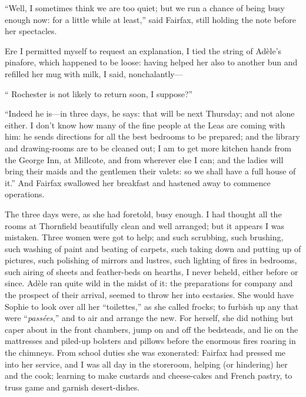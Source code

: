 \enquote{Well, I sometimes think we are too quiet; but we run a chance
of being busy enough now: for a little while at least,} said \Mrs{}
Fairfax, still holding the note before her spectacles.

Ere I permitted myself to request an explanation, I tied the string of
Adèle's pinafore, which happened to be loose: having helped her also to
another bun and refilled her mug with milk, I said, nonchalantly---

\enquote{\Mr{} Rochester is not likely to return soon, I suppose?}

\enquote{Indeed he is---in three days, he says: that will be next
Thursday; and not alone either. I don't know how many of the fine
people at the Leas are coming with him: he sends directions for all the
best bedrooms to be prepared; and the library and drawing-rooms are to
be cleaned out; I am to get more kitchen hands from the George Inn, at
Millcote, and from wherever else I can; and the ladies will bring their
maids and the gentlemen their valets: so we shall have a full house of
it.} And \Mrs{} Fairfax swallowed her breakfast and hastened away to
commence operations.

The three days were, as she had foretold, busy enough. I had thought
all the rooms at Thornfield beautifully clean and well arranged; but it
appears I was mistaken. Three women were got to help; and such
scrubbing, such brushing, such washing of paint and beating of carpets,
such taking down and putting up of pictures, such polishing of mirrors
and lustres, such lighting of fires in bedrooms, such airing of sheets
and feather-beds on hearths, I never beheld, either before or since. 
Adèle ran quite wild in the midst of it: the preparations for company
and the prospect of their arrival, seemed to throw her into ecstasies. 
She would have Sophie to look over all her \foreignquote{french}{toilettes,} as she
called frocks; to furbish up any that were \foreignquote{french}{\emph{passées},} and to
air and arrange the new. For herself, she did nothing but caper about
in the front chambers, jump on and off the bedsteads, and lie on the
mattresses and piled-up bolsters and pillows before the enormous fires
roaring in the chimneys. From school duties she was exonerated: \Mrs{}
Fairfax had pressed me into her service, and I was all day in the
storeroom, helping (or hindering) her and the cook; learning to make
custards and cheese-cakes and French pastry, to truss game and garnish
desert-dishes.

